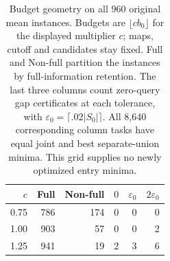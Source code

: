\begin{table}[t]
\centering\small
\begin{tabular}{rrrrrr}
\toprule
$c$ & Full & Non-full & $0$ & $\varepsilon_0$ & $2\varepsilon_0$ \\
\midrule
0.75 & 786 & 174 & 0 & 0 & 0 \\
1.00 & 903 & 57 & 0 & 0 & 2 \\
1.25 & 941 & 19 & 2 & 3 & 6 \\
\bottomrule
\end{tabular}
\caption{Budget geometry on all 960 original mean instances. Budgets are $\lfloor cb_0\rfloor$ for the displayed multiplier $c$; maps, cutoff and candidates stay fixed. Full and Non-full partition the instances by full-information retention. The last three columns count zero-query gap certificates at each tolerance, with $\varepsilon_0=\lceil.02|S_0|\rceil$. All 8,640 corresponding column tasks have equal joint and best separate-union minima. This grid supplies no newly optimized entry minima.}
\label{tab:budget-geometry}
\end{table}

